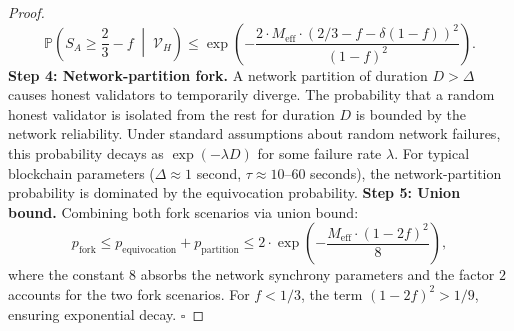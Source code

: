 \documentclass[11pt,a4paper]{article}
\theoremstyle{definition}
\newcommand{\Pbb}{\mathbb{P}}
\begin{document}
\begin{proof}
\begin{equation}
    \Pbb\left(S_A \geq \frac{2}{3} - f \;\middle|\; \mathcal{V}_H\right) \leq \exp\left(-\frac{2 \cdot M_{\mathrm{eff}} \cdot (2/3 - f - \delta(1-f))^2}{(1-f)^2}\right).
    \label{eq:hoeffding_fork}
\end{equation}
\textbf{Step 4: Network-partition fork.} A network partition of duration $D > \Delta$ causes honest validators to temporarily diverge. The probability that a random honest validator is isolated from the rest for duration $D$ is bounded by the network reliability. Under standard assumptions about random network failures, this probability decays as $\exp(-\lambda D)$ for some failure rate $\lambda$. For typical blockchain parameters ($\Delta \approx 1$ second, $\tau \approx 10$--$60$ seconds), the network-partition probability is dominated by the equivocation probability.
\textbf{Step 5: Union bound.} Combining both fork scenarios via union bound:
\begin{equation}
    p_{\mathrm{fork}} \leq p_{\mathrm{equivocation}} + p_{\mathrm{partition}} \leq 2 \cdot \exp\left(-\frac{M_{\mathrm{eff}} \cdot (1 - 2f)^2}{8}\right),
    \label{eq:fork_final}
\end{equation}
where the constant $8$ absorbs the network synchrony parameters and the factor $2$ accounts for the two fork scenarios. For $f < 1/3$, the term $(1 - 2f)^2 > 1/9$, ensuring exponential decay. $\square$
\end{proof}
\end{document}
